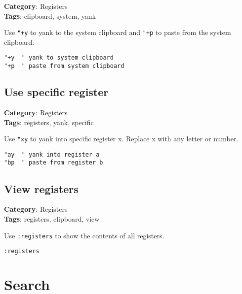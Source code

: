 {{{{{{{{{{{\textbf{Category}: Registers\\ \textbf{Tags}: clipboard, system, yank
\vspace{0.5cm}

Use {\footnotesize \Verb§"+y§} to yank to the system clipboard and {\footnotesize \Verb§"+p§} to paste from the system clipboard.

\begin{Exa*}{}
\begin{Verbatim}[fontsize=\footnotesize, breaklines, breakanywhere]
"+y  " yank to system clipboard
"+p  " paste from system clipboard
\end{Verbatim}
\end{Exa*}

\section{Use specific register}

\textbf{Category}: Registers\\ \textbf{Tags}: registers, yank, specific
\vspace{0.5cm}

Use {\footnotesize \Verb§"xy§} to yank into specific register x. Replace x with any letter or number.

\begin{Exa*}{}
\begin{Verbatim}[fontsize=\footnotesize, breaklines, breakanywhere]
"ay  " yank into register a
"bp  " paste from register b
\end{Verbatim}
\end{Exa*}

\section{View registers}

\textbf{Category}: Registers\\ \textbf{Tags}: registers, clipboard, view
\vspace{0.5cm}

Use {\footnotesize \Verb§:registers§} to show the contents of all registers.

\begin{Exa*}{}
\begin{Verbatim}[fontsize=\footnotesize, breaklines, breakanywhere]
:registers
\end{Verbatim}
\end{Exa*}

\chapter{Search}
}}}}}}}}}}}
